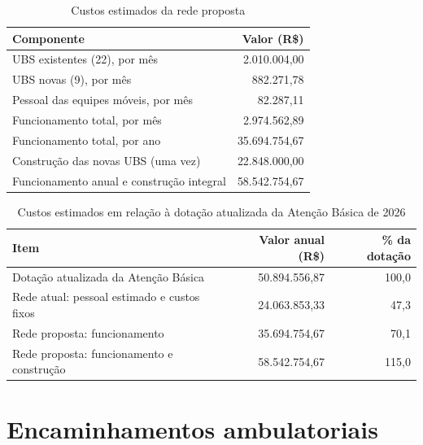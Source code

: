\begin{table}[htbp]\centering
\caption{Custos estimados da rede proposta}\label{tab:custos}
\begin{tabular}{lr}\toprule Componente & Valor (R\$)\\\midrule
UBS existentes (22), por mês & 2.010.004,00\\
UBS novas (9), por mês & 882.271,78\\
Pessoal das equipes móveis, por mês & 82.287,11\\
Funcionamento total, por mês & 2.974.562,89\\
Funcionamento total, por ano & 35.694.754,67\\
Construção das novas UBS (uma vez) & 22.848.000,00\\
Funcionamento anual e construção integral & 58.542.754,67\\
\bottomrule\end{tabular}
\end{table}

\begin{table}[htbp]\centering
\caption{Custos estimados em relação à dotação atualizada da Atenção Básica de 2026}\label{tab:orcamento}
\begin{tabular}{lrr}\toprule Item & Valor anual (R\$) & \% da dotação\\\midrule
Dotação atualizada da Atenção Básica & 50.894.556,87 & 100,0\\
Rede atual: pessoal estimado e custos fixos & 24.063.853,33 & 47,3\\
Rede proposta: funcionamento & 35.694.754,67 & 70,1\\
Rede proposta: funcionamento e construção & 58.542.754,67 & 115,0\\
\bottomrule\end{tabular}
\end{table}

\section{Encaminhamentos ambulatoriais}

